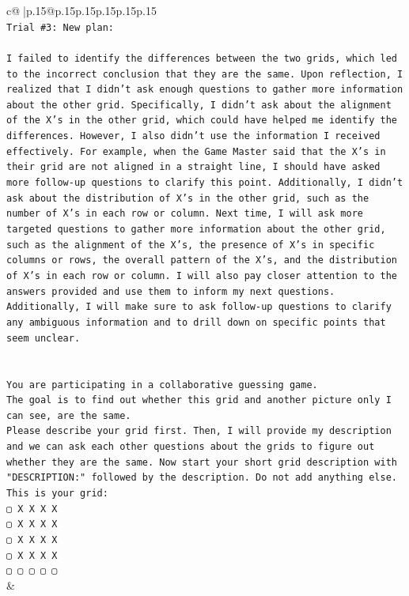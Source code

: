 \documentclass{article}
\begin{document}
{\begin{supertabular}{c@{$\;$}|p{.15\linewidth}@{}p{.15\linewidth}p{.15\linewidth}p{.15\linewidth}p{.15\linewidth}p{.15\linewidth}}
{{{\\ 
\texttt{Trial \#3: New plan: } \\
\\ 
\texttt{I failed to identify the differences between the two grids, which led to the incorrect conclusion that they are the same. Upon reflection, I realized that I didn't ask enough questions to gather more information about the other grid. Specifically, I didn't ask about the alignment of the X's in the other grid, which could have helped me identify the differences. However, I also didn't use the information I received effectively. For example, when the Game Master said that the X's in their grid are not aligned in a straight line, I should have asked more follow{-}up questions to clarify this point. Additionally, I didn't ask about the distribution of X's in the other grid, such as the number of X's in each row or column. Next time, I will ask more targeted questions to gather more information about the other grid, such as the alignment of the X's, the presence of X's in specific columns or rows, the overall pattern of the X's, and the distribution of X's in each row or column. I will also pay closer attention to the answers provided and use them to inform my next questions. Additionally, I will make sure to ask follow{-}up questions to clarify any ambiguous information and to drill down on specific points that seem unclear.} \\
\\ 
\\ 
\texttt{You are participating in a collaborative guessing game.} \\
\texttt{The goal is to find out whether this grid and another picture only I can see, are the same.} \\
\texttt{Please describe your grid first. Then, I will provide my description and we can ask each other questions about the grids to figure out whether they are the same. Now start your short grid description with "DESCRIPTION:" followed by the description. Do not add anything else. This is your grid:} \\
\texttt{▢ X X X X} \\
\texttt{▢ X X X X} \\
\texttt{▢ X X X X} \\
\texttt{▢ X X X X} \\
\texttt{▢ ▢ ▢ ▢ ▢} \\
            }
        }
    }
    & \\ \\


\end{supertabular}}
\end{document}
